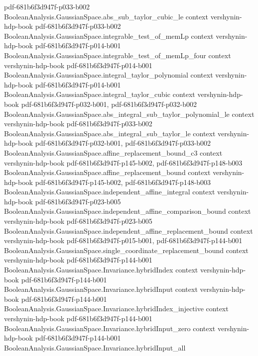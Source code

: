 \begin{theorem}
  {pdf-681b6f3d947f-p033-b002}
\proofstep
  {BooleanAnalysis.GaussianSpace.abs_sub_taylor_cubic_le}
  {context}
  {vershynin-hdp-book}
  {pdf-681b6f3d947f-p033-b002}
\proofstep
  {BooleanAnalysis.GaussianSpace.integrable_test_of_memLp}
  {context}
  {vershynin-hdp-book}
  {pdf-681b6f3d947f-p014-b001}
\proofstep
  {BooleanAnalysis.GaussianSpace.integrable_test_of_memLp_four}
  {context}
  {vershynin-hdp-book}
  {pdf-681b6f3d947f-p014-b001}
\proofstep
  {BooleanAnalysis.GaussianSpace.integral_taylor_polynomial}
  {context}
  {vershynin-hdp-book}
  {pdf-681b6f3d947f-p014-b001}
\proofstep
  {BooleanAnalysis.GaussianSpace.integral_taylor_cubic}
  {context}
  {vershynin-hdp-book}
  {pdf-681b6f3d947f-p032-b001,
    pdf-681b6f3d947f-p032-b002}
\proofstep
  {BooleanAnalysis.GaussianSpace.abs_integral_sub_taylor_polynomial_le}
  {context}
  {vershynin-hdp-book}
  {pdf-681b6f3d947f-p033-b002}
\proofstep
  {BooleanAnalysis.GaussianSpace.abs_integral_sub_taylor_le}
  {context}
  {vershynin-hdp-book}
  {pdf-681b6f3d947f-p032-b001,
    pdf-681b6f3d947f-p033-b002}
\proofstep
  {BooleanAnalysis.GaussianSpace.affine_replacement_bound_c3}
  {context}
  {vershynin-hdp-book}
  {pdf-681b6f3d947f-p145-b002,
    pdf-681b6f3d947f-p148-b003}
\proofstep
  {BooleanAnalysis.GaussianSpace.affine_replacement_bound}
  {context}
  {vershynin-hdp-book}
  {pdf-681b6f3d947f-p145-b002,
    pdf-681b6f3d947f-p148-b003}
\proofstep
  {BooleanAnalysis.GaussianSpace.independent_affine_integral}
  {context}
  {vershynin-hdp-book}
  {pdf-681b6f3d947f-p023-b005}
\proofstep
  {BooleanAnalysis.GaussianSpace.independent_affine_comparison_bound}
  {context}
  {vershynin-hdp-book}
  {pdf-681b6f3d947f-p023-b005}
\proofstep
  {BooleanAnalysis.GaussianSpace.independent_affine_replacement_bound}
  {context}
  {vershynin-hdp-book}
  {pdf-681b6f3d947f-p015-b001,
    pdf-681b6f3d947f-p144-b001}
\proofstep
  {BooleanAnalysis.GaussianSpace.single_coordinate_replacement_bound}
  {context}
  {vershynin-hdp-book}
  {pdf-681b6f3d947f-p144-b001}
\proofstep
  {BooleanAnalysis.GaussianSpace.Invariance.hybridIndex}
  {context}
  {vershynin-hdp-book}
  {pdf-681b6f3d947f-p144-b001}
\proofstep
  {BooleanAnalysis.GaussianSpace.Invariance.hybridInput}
  {context}
  {vershynin-hdp-book}
  {pdf-681b6f3d947f-p144-b001}
\proofstep
  {BooleanAnalysis.GaussianSpace.Invariance.hybridIndex_injective}
  {context}
  {vershynin-hdp-book}
  {pdf-681b6f3d947f-p144-b001}
\proofstep
  {BooleanAnalysis.GaussianSpace.Invariance.hybridInput_zero}
  {context}
  {vershynin-hdp-book}
  {pdf-681b6f3d947f-p144-b001}
\proofstep
  {BooleanAnalysis.GaussianSpace.Invariance.hybridInput_all}

\end{theorem}
